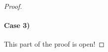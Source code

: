 \documentclass[envcountsame]{llncs}
\newcommand\MS[2][r]{\ifx t#1 \textcolor{blue}{[\textbf{MS:} #2]}
  \else \begin{center}\textcolor{blue}{\textbf{MS:} #2} \end{center} \fi}
\begin{document}
\begin{proof}
  \paragraph{Case 3)}{ This part of the proof is open!





  }




\end{proof}
\end{document}

